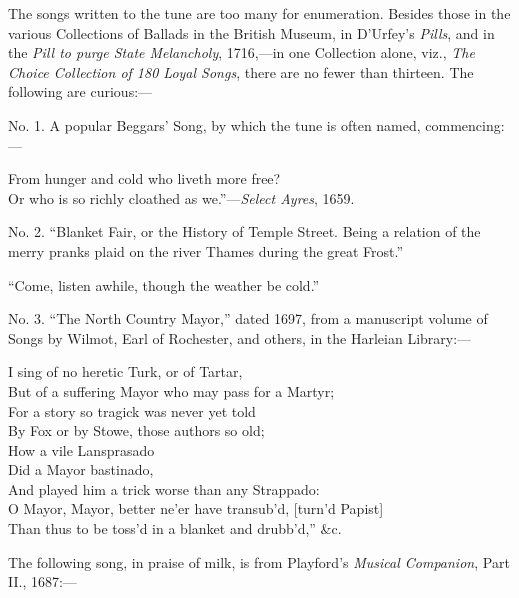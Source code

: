 The songs written to the tune are too many for enumeration. Besides those
in the various Collections of Ballads in the British Museum, in D’Urfey’s \textit{Pills},
and in the \textit{Pill to purge State Melancholy}, 1716,—in one Collection alone, viz.,
\textit{The Choice Collection of 180 Loyal Songs}, there are no fewer than thirteen. The
following are curious:—

No. 1. A popular Beggars’ Song, by which the tune is often named, commencing:—
\begin{scverse}From hunger and cold who liveth more free?\\
Or who is so richly cloathed as we.”—\textit{Select Ayres}, 1659.
\end{scverse}

No. 2. “Blanket Fair, or the History of Temple Street. Being a relation of
the merry pranks plaid on the river Thames during the great Frost.”
\begin{scverse}“Come, listen awhile, though the weather be cold.”
\end{scverse}

No. 3. “The North Country Mayor,” dated 1697, from a manuscript volume
of Songs by Wilmot, Earl of Rochester, and others, in the Harleian Library:—
\begin{scverse}\begin{patverse}
I sing of no heretic Turk, or of Tartar,\\
But of a suffering Mayor who may pass for a Martyr;\\
For a story so tragick was never yet told\\
By Fox or by Stowe, those authors so old;\\
How a vile Lansprasado\\
Did a Mayor bastinado,\\
And played him a trick worse than any Strappado:\\
O Mayor, Mayor, better ne’er have transub’d, [turn’d Papist]\\
Than thus to be toss’d in a blanket and drubb’d,” \&c.
\end{patverse}
\end{scverse}

The following song, in praise of milk, is from Playford’s \textit{Musical Companion},
Part II., 1687:—


